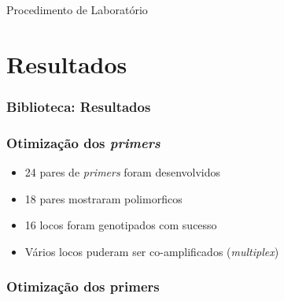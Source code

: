 \documentclass{beamer}
\begin{document}
\begin{frame}{Procedimento de Laboratório}
\centering


\end{frame}

\section{Resultados}
\begin{frame}
  \frametitle{Biblioteca: Resultados}

  \end{frame}

\begin{frame}
  \frametitle{Otimização dos \textit{primers}}
  \begin{itemize}[<+->]
  \item 24 pares de \textit{primers} foram desenvolvidos
  \item 18 pares mostraram polimorficos
  \item 16 locos foram genotipados com sucesso
    
\item Vários locos puderam ser co-amplificados (\textit{multiplex})
    \end{itemize}
  \end{frame}


  \begin{frame}
    \frametitle{Otimização dos primers}
    \centering
  \end{frame}
\end{document}
